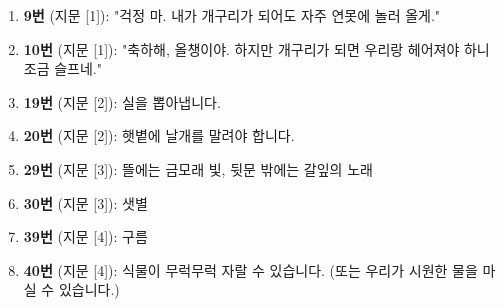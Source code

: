 \documentclass[12pt, a4paper]{article}
\begin{document}
\vspace{2mm}

\begin{enumerate}[label={}, leftmargin=0em, itemsep=2pt]
\item \textbf{9번} (지문 [1]): "걱정 마. 내가 개구리가 되어도 자주 연못에 놀러 올게."
\item \textbf{10번} (지문 [1]): "축하해, 올챙이야. 하지만 개구리가 되면 우리랑 헤어져야 하니 조금 슬프네."
\item \textbf{19번} (지문 [2]): 실을 뽑아냅니다.
\item \textbf{20번} (지문 [2]): 햇볕에 날개를 말려야 합니다.
\item \textbf{29번} (지문 [3]): 뜰에는 금모래 빛, 뒷문 밖에는 갈잎의 노래
\item \textbf{30번} (지문 [3]): 샛별
\item \textbf{39번} (지문 [4]): 구름
\item \textbf{40번} (지문 [4]): 식물이 무럭무럭 자랄 수 있습니다. (또는 우리가 시원한 물을 마실 수 있습니다.)
\end{enumerate}
\end{document}
